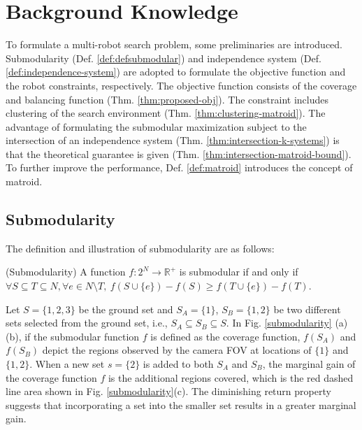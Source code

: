 \chapter{Background Knowledge}
To formulate a multi-robot search problem, some preliminaries are introduced.
Submodularity (Def. \ref{def:defsubmodular}) and independence system (Def. \ref{def:independence-system}) are adopted to formulate the objective function and the robot constraints, respectively.
The objective function consists of the coverage and balancing function (Thm. \ref{thm:proposed-obj}).
The constraint includes clustering of the search environment (Thm. \ref{thm:clustering-matroid}).
The advantage of formulating the submodular maximization subject to the intersection of an independence system (Thm. \ref{thm:intersection-k-systems}) is that the theoretical guarantee is given (Thm. \ref{thm:intersection-matroid-bound}).
To further improve the performance, Def. \ref{def:matroid} introduces the concept of matroid.\\


\section{Submodularity}

The definition and illustration of submodularity are as follows:

\begin{definition} \label{def:defsubmodular} (Submodularity) \cite{nemhauser1978analysis}
A function $f:2^N \rightarrow \mathbb{R}^+$ is submodular if and only if $\forall S \subseteq T \subseteq N, \forall e \in N \setminus T, \ f(S\cup \{e\}) - f(S) \geq f(T\cup \{e\}) - f(T)$. \\
\end{definition}

Let $S=\{1,2,3\}$ be the ground set and $S_A=\{1\}$, $S_B=\{1,2\}$ be two different sets selected from the ground set, i.e., $S_A \subseteq S_B \subseteq S$. In Fig. \ref{submodularity} (a)(b), if the submodular function $f$ is defined as the coverage function, $f(S_A)$ and $f(S_B)$ depict the regions observed by the camera FOV at locations of $\{1\}$ and $\{1,2\}$.
When a new set $s=\{2\}$ is added to both $S_A$ and $S_B$, the marginal gain of the coverage function $f$ is the additional regions covered, which is the red dashed line area shown in Fig. \ref{submodularity}(c). The diminishing return property suggests that incorporating a set into the smaller set results in a greater marginal gain.\\

